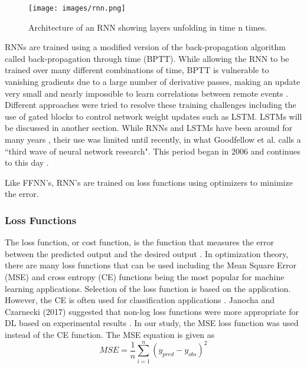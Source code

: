 %
\begin{figure}[H]
\centering
\texttt{[image: images/rnn.png]}  %
\caption{Architecture of an RNN showing layers unfolding in time n times.}
\label{fig:rnn}
\end{figure}
%

RNNs are trained using a modified version of the back-propagation algorithm called back-propagation through time (BPTT). While allowing the RNN to be trained over many different combinations of time, BPTT is vulnerable to vanishing gradients due to a large number of derivative passes, making an update very small and nearly impossible to learn correlations between remote events \citep{Pascanu2013, Graves2013a}. Different approaches were tried to resolve these training challenges including the use of gated blocks to control network weight updates such as LSTM. LSTMs will be discussed in another section. While RNNs and LSTMs have been around for many years \citep{Hochreiter1997}, their use was limited until recently, in what Goodfellow et al. calls a ``third wave of neural network research". This period began in 2006 and continues to this day \citep{Goodfellow2016}.

Like FFNN's, RNN's are trained on loss functions using optimizers to minimize the error. 

\subsubsection{Loss Functions}

The loss function, or cost function, is the function that measures the error between the predicted output and the desired output \citep{Goodfellow2016}. In optimization theory, there are many loss functions that can be used including the Mean Square Error (MSE) and cross entropy (CE) functions being the most popular for machine learning applications.  Selection of the loss function is based on the application. However, the CE is often used for classification applications \citep{Kline2005, Wu2017}. Janocha and Czarnecki (2017) suggested that non-log loss functions were more appropriate for DL based on experimental results \citep{Janocha2017}. In our study, the MSE loss function was used instead of the CE function. The MSE equation is given as 
%
\begin{equation}
\label{eq:MSE}
MSE = \frac{1}{n} \sum_{i=1}^{n} \left( y_{pred} - y_{obs} \right)^{2}
\end{equation}
%
